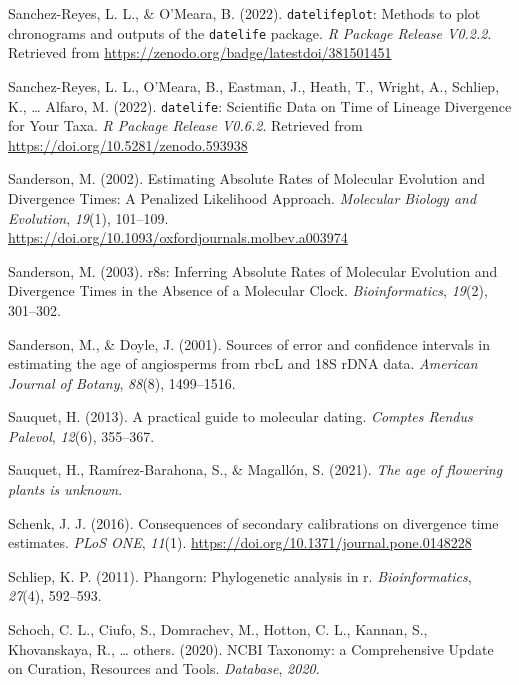 \documentclass[english,man]{apa6}
\begin{document}
\leavevmode\hypertarget{ref-datelifeplot}{}%
Sanchez-Reyes, L. L., \& O'Meara, B. (2022). \texttt{datelifeplot}: Methods to plot chronograms and outputs of the \texttt{datelife} package. \emph{R Package Release V0.2.2}. Retrieved from \url{https://zenodo.org/badge/latestdoi/381501451}

\leavevmode\hypertarget{ref-datelifeR}{}%
Sanchez-Reyes, L. L., O'Meara, B., Eastman, J., Heath, T., Wright, A., Schliep, K., \ldots{} Alfaro, M. (2022). \texttt{datelife}: Scientific Data on Time of Lineage Divergence for Your Taxa. \emph{R Package Release V0.6.2}. Retrieved from \url{https://doi.org/10.5281/zenodo.593938}

\leavevmode\hypertarget{ref-sanderson2002}{}%
Sanderson, M. (2002). Estimating Absolute Rates of Molecular Evolution and Divergence Times: A Penalized Likelihood Approach. \emph{Molecular Biology and Evolution}, \emph{19}(1), 101--109. \url{https://doi.org/10.1093/oxfordjournals.molbev.a003974}

\leavevmode\hypertarget{ref-sanderson2003r8s}{}%
Sanderson, M. (2003). r8s: Inferring Absolute Rates of Molecular Evolution and Divergence Times in the Absence of a Molecular Clock. \emph{Bioinformatics}, \emph{19}(2), 301--302.

\leavevmode\hypertarget{ref-sanderson2001sources}{}%
Sanderson, M., \& Doyle, J. (2001). Sources of error and confidence intervals in estimating the age of angiosperms from rbcL and 18S rDNA data. \emph{American Journal of Botany}, \emph{88}(8), 1499--1516.

\leavevmode\hypertarget{ref-sauquet2013practical}{}%
Sauquet, H. (2013). A practical guide to molecular dating. \emph{Comptes Rendus Palevol}, \emph{12}(6), 355--367.

\leavevmode\hypertarget{ref-sauquet2021age}{}%
Sauquet, H., Ramírez-Barahona, S., \& Magallón, S. (2021). \emph{The age of flowering plants is unknown}.

\leavevmode\hypertarget{ref-schenk2016sec}{}%
Schenk, J. J. (2016). Consequences of secondary calibrations on divergence time estimates. \emph{PLoS ONE}, \emph{11}(1). \url{https://doi.org/10.1371/journal.pone.0148228}

\leavevmode\hypertarget{ref-schliep2011phangorn}{}%
Schliep, K. P. (2011). Phangorn: Phylogenetic analysis in r. \emph{Bioinformatics}, \emph{27}(4), 592--593.

\leavevmode\hypertarget{ref-schoch2020ncbi}{}%
Schoch, C. L., Ciufo, S., Domrachev, M., Hotton, C. L., Kannan, S., Khovanskaya, R., \ldots{} others. (2020). NCBI Taxonomy: a Comprehensive Update on Curation, Resources and Tools. \emph{Database}, \emph{2020}.
\end{document}
